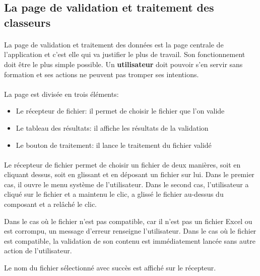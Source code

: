 \subsection{La page de validation et traitement des classeurs}
\label{subsec:spreadsheet-page}

\paragraph{}
La page de validation et traitement des données est la page centrale de l'application et c'est elle qui va justifier le plus de travail.
Son fonctionnement doit être le plus simple possible.
Un \textbf{utilisateur} doit pouvoir s'en servir sans formation et ses actions ne peuvent pas tromper ses intentions.

\paragraph{}
La page est divisée en trois éléments:
\begin{itemize}
    \item Le récepteur de fichier: il permet de choisir le fichier que l'on valide
    \item Le tableau des résultats: il affiche les résultats de la validation
    \item Le bouton de traitement: il lance le traitement du fichier validé
\end{itemize}

\paragraph{}
Le récepteur de fichier permet de choisir un fichier de deux manières, soit en cliquant dessus, soit en glissant et en déposant un fichier sur lui.
Dans le premier cas, il ouvre le menu système\fnmark{} de l'utilisateur. Dans le second cas, l'utilisateur a cliqué sur le fichier et a maintenu le clic, a glissé le fichier au-dessus du composant et a relâché le clic.

Dans le cas où le fichier n'est pas compatible, car il n'est pas un fichier Excel ou est corrompu, un message d'erreur renseigne l'utilisateur.
Dans le cas où le fichier est compatible, la validation de son contenu est immédiatement lancée sans autre action de l'utilisateur.

Le nom du fichier sélectionné avec succès est affiché sur le récepteur.

